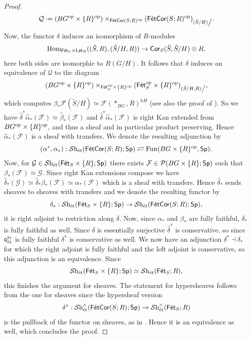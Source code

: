 \documentclass[reqno]{amsart}
\numberwithin{equation}{section}\theoremstyle{thms}
\theoremstyle{defn}
\newcommand{\cF}{\mathcal{F}}
\newcommand{\cG}{\mathcal{G}}
\newcommand{\cP}{\mathcal{P}}
\newcommand{\cQ}{\mathcal{Q}}
\newcommand{\tn}[1]{\textnormal{#1}}
\newcommand{\tsf}[1]{\textsf{\textup{#1}}}
\newcommand{\mcal}[1]{\mathcal{#1}}
\newcommand*{\defeq}{\mathrel{\vcenter{\baselineskip0.4ex \lineskiplimit0pt
\hbox{\scriptsize.}\hbox{\scriptsize.}}}%
=}
\newcommand{\op}{\tn{op}}
\newcommand{\fun}{\tn{Fun}}
\newcommand{\Hom}{\tn{Hom}}
\newcommand{\sheaves}{\mcal{S}\tn{h}}
\newcommand{\spec}{\tsf{Sp}}
\newcommand{\fets}{\tsf{Fét}_S}
\newcommand{\corfets}[1]{\tsf{FétCor}(S;#1)}
\newcommand{\lat}{\tsf{Lat}}
\begin{document}
\begin{proof}
$$\cQ \defeq (BG^\op \times \{R \}^\op) \times_{\corfets{R}^\op} (\corfets{R}^\op)_{(\tilde{S}/H)\tn{\big /}}.$$
Now, the functor $\delta$ induces an isomorphism of $R$-modules
$$\Hom_{\fets \times \lat_R}((\tilde{S},R),(\tilde{S}/H,R)) \to \tsf{Cor}_S(\tilde{S},\tilde{S}/H)\otimes R,$$
here both sides are isomorphic to $R(G/H)$. It follows that $\delta$ induces an equivalence of $\cQ$ to the diagram
$$(BG^\op \times \{R \}^\op) \times_{\fets^\op \times \{R \}^\op} (\fets^\op \times \{R \}^\op)_{(\tilde{S}/H,R)\tn{\big /}},$$
which computes $\beta_*\cF(\tilde{S}/H) \simeq \cF(\ast_{BG},R)^{hH}$ (see also the proof of \cite[Proposition 7.3.1.16]{kerodon}). So we have $\hat{\delta}^*\hat{\alpha}_*(\cF) \simeq \hat{\beta}_*(\cF)$ and $\hat{\delta}^*\hat{\alpha}_*(\cF)$ is right Kan extended from $BG^\op \times \{R\}^\op$, and thus a sheaf and in particular product preserving. Hence $\hat{\alpha}_*(\cF)$ is a sheaf with transfers. We denote the resulting adjunction by
$$(\alpha^*,\alpha_*): \sheaves_{\tn{ét}}(\corfets{R};\spec) \rightleftarrows \fun(BG \times \{R \}^\op,\spec).$$
Now, for $\cG \in \sheaves_{\tn{ét}}(\fets \times \{R \};\spec)$ there exists $\cF \in \cP(BG \times \{R \};\spec)$ such that $\beta_*(\cF) \simeq \cG$. Since right Kan extensions compose we have $\hat{\delta}_*(\cG) \simeq \hat{\delta}_*\beta_*(\cF) \simeq \alpha_*(\cF)$ which is a sheaf with transfers. Hence $\hat{\delta}_*$ sends sheaves to sheaves with transfers and we denote the resulting functor by 
$$\delta_*: \sheaves_{\tn{ét}}(\fets \times \{R\};\spec) \to \sheaves_{\tn{ét}}(\corfets{R};\spec),$$
it is right adjoint to restriction along $\delta$. Now, since $\alpha_*$ and $\beta_*$ are fully faithful, $\delta_*$ is fully faithful as well. Since $\delta$ is essentially surjective $\hat{\delta}^*$ is conservative, so since $\tsf{o}_{\tn{ét}}^{\tn{tr}}$ is fully faithful $\delta^*$ is conservative as well. We now have an adjunction $\delta^* \dashv \delta_*$ for which the right adjoint is fully faithful and the left adjoint is conservative, so this adjunction is an equivalence. Since
$$\sheaves_{\tn{ét}}(\fets \times \{R\};\spec) \simeq \sheaves_{\tn{ét}}(\fets;R),$$
this finishes the argument for sheaves. The statement for hypersheaves follows from the one for sheaves since the hypersheaf version 
$$\delta^*: \sheaves_{\tn{ét}}^{\wedge}(\corfets{R};\spec) \to \sheaves_{\tn{ét}}^{\wedge}(\fets;R)$$
is the pullback of the functor on sheaves, as in . Hence it is an equivalence as well, which concludes the proof.
\end{proof}
\end{document}
